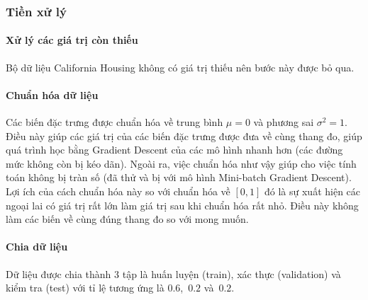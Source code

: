 \subsubsection{Tiền xử lý}

\paragraph{Xử lý các giá trị còn thiếu} Bộ dữ liệu California Housing không có
giá trị thiếu nên bước này được bỏ qua.

\paragraph{Chuẩn hóa dữ liệu} Các biến đặc trưng được chuẩn hóa về trung bình
$\mu = 0$ và phương sai $\sigma^2 = 1$. Điều này giúp các giá trị của các biến
đặc trưng được đưa về cùng thang đo, giúp quá trình học bằng Gradient Descent
của các mô hình nhanh hơn (các đường mức không còn bị kéo dãn). Ngoài ra, việc
chuẩn hóa như vậy giúp cho việc tính toán không bị tràn số (đã thử và bị với mô
hình Mini-batch Gradient Descent). Lợi ích của cách chuẩn hóa này so với chuẩn
hóa về $[0, 1]$ đó là sự xuất hiện các ngoại lai có giá trị rất lớn làm giá trị
sau khi chuẩn hóa rất nhỏ. Điều này không làm các biến về cùng đúng thang đo so
với mong muốn.

\paragraph{Chia dữ liệu} Dữ liệu được chia thành 3 tập là huấn luyện (train),
xác thực (validation) và kiểm tra (test) với tỉ lệ tương ứng là $0.6$,~$0.2$
và~$0.2$.
